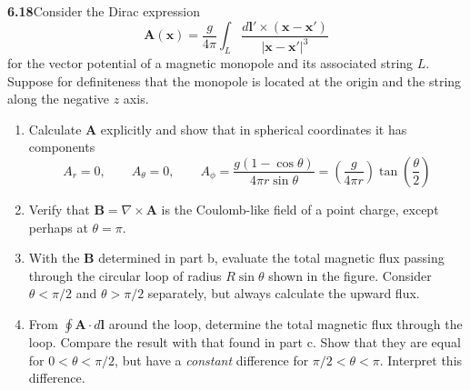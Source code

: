 \par\bigskip
\noindent\textbf{6.18}\quad Consider the Dirac expression
\[
\mathbf{A}(\mathbf{x})=\frac{g}{4\pi}\int_{L}\frac{d\mathbf{l}'\times(\mathbf{x}-\mathbf{x}')}{|\mathbf{x}-\mathbf{x}'|^{3}}
\]
for the vector potential of a magnetic monopole and its associated string $L$. Suppose for definiteness that the monopole is located at the origin and the string along the negative $z$ axis.
\begin{enumerate}
\item[(a)] Calculate $\mathbf{A}$ explicitly and show that in spherical coordinates it has components
\[
A_{r}=0,\qquad A_{\theta}=0,\qquad A_{\phi}=\frac{g(1-\cos\theta)}{4\pi r\sin\theta}=\left(\frac{g}{4\pi r}\right)\tan\!\left(\frac{\theta}{2}\right)
\]
\item[(b)] Verify that $\mathbf{B}=\nabla\times\mathbf{A}$ is the Coulomb-like field of a point charge, except perhaps at $\theta=\pi$.
\item[(c)] With the $\mathbf{B}$ determined in part b, evaluate the total magnetic flux passing through the circular loop of radius $R\sin\theta$ shown in the figure. Consider $\theta<\pi/2$ and $\theta>\pi/2$ separately, but always calculate the upward flux.
\item[(d)] From $\oint\mathbf{A}\cdot d\mathbf{l}$ around the loop, determine the total magnetic flux through the loop. Compare the result with that found in part c. Show that they are equal for $0<\theta<\pi/2$, but have a \emph{constant} difference for $\pi/2<\theta<\pi$. Interpret this difference.
\end{enumerate}

\begin{center}
\end{center}
\solution


